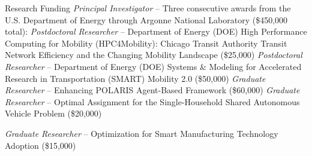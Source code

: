 \begin{rubric}{Research Funding}
\vspace{5pt}
\entry*[05/2021 -- 07/2024]%
	\textit{Principal Investigator} -- {Three consecutive awards from the U.S. Department of Energy through Argonne National Laboratory (\$450,000 total):}
\entry*[05/2023 -- 07/2024]%
	\hspace*{1.2em}{Optimization for Transit, Freight, and Urban Mobility Problems (\$200,000)}
\entry*[05/2022 -- 05/2023]%
	\hspace*{1.2em}{Optimization for Transit and Freight (\$130,000)}
\entry*[05/2021 -- 05/2022]%
	\hspace*{1.2em}{Development and Implementation of Optimization Models to Support Transportation and Mobility (\$120,000)}
\entry*[2020 -- 2021]%
	\textit{Postdoctoral Researcher} -- {Department of Energy (DOE) High Performance Computing for Mobility (HPC4Mobility): Chicago Transit Authority Transit Network Efficiency and the Changing Mobility Landscape (\$25,000)}
\entry*[2020 -- 2021]%
	\textit{Postdoctoral Researcher} -- {Department of Energy (DOE) Systems \& Modeling for Accelerated Research in Transportation (SMART) Mobility 2.0 (\$50,000)}
\entry*[01/2020 -- 05/2020]%
	\textit{Graduate Researcher} -- {Enhancing POLARIS Agent-Based Framework (\$60,000)}
\entry*[05/2019 -- 08/2019]%
	\textit{Graduate Researcher} -- {Optimal Assignment for the Single-Household Shared Autonomous Vehicle Problem (\$20,000)}

\vspace{5pt}
\entry*[05/2018 -- 08/2018]%
	\textit{Graduate Researcher} -- {Optimization for Smart Manufacturing Technology Adoption (\$15,000)}
\end{rubric}
